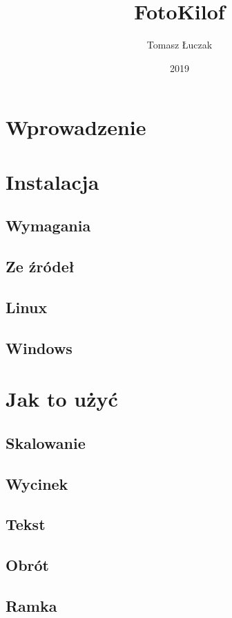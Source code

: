 \documentclass[oneside,11pt,sfheadings]{mwart}
\author{Tomasz Łuczak}
\title{FotoKilof}
\date{2019}
\begin{document}
\maketitle

\tableofcontents

\section{Wprowadzenie}

\section{Instalacja}
\subsection{Wymagania}
\subsection{Ze źródeł}

\subsection{Linux}

\subsection{Windows}

\section{Jak to użyć}
\subsection{Skalowanie}
\subsection{Wycinek}
\subsection{Tekst}
\subsection{Obrót}
\subsection{Ramka}
\end{document}
